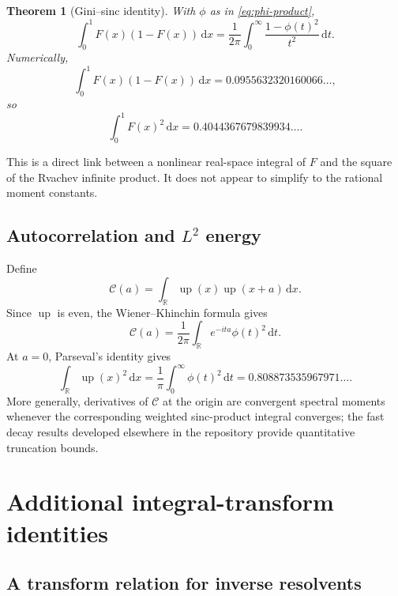 \documentclass[11pt,oneside]{article}
\newtheorem{theorem}{Theorem}[section]
\theoremstyle{definition}
\newcommand{\F}{F}
\newcommand{\upf}{\operatorname{up}}
\newcommand{\R}{\mathbb R}
\newcommand{\dd}{\,\mathrm d}
\begin{document}
\begin{theorem}[Gini--sinc identity]\label{thm:gini-sinc}
With \(\phi\) as in \cref{eq:phi-product},
\begin{equation}\label{eq:Gini-sinc}
 \boxed{\displaystyle
 \int_0^1\F(x)(1-\F(x))\dd x
 =\frac1{2\pi}\int_0^\infty
 \frac{1-\phi(t)^2}{t^2}\dd t.}
\end{equation}
Numerically,
\begin{equation}\label{eq:Gini-numeric}
 \int_0^1\F(x)(1-\F(x))\dd x
 =0.0955632320160066\ldots,
\end{equation}
so
\begin{equation}\label{eq:F2-numeric}
 \int_0^1\F(x)^2\dd x
 =0.4044367679839934\ldots.
\end{equation}
\end{theorem}

This is a direct link between a nonlinear real-space integral of \(\F\) and the square
of the Rvachev infinite product.  It does not appear to simplify to the rational moment
constants.

\subsection{Autocorrelation and \(L^2\) energy}

Define
\begin{equation}\label{eq:Cautocorr}
 \mathcal C(a)=\int_\R\upf(x)\upf(x+a)\dd x.
\end{equation}
Since \(\upf\) is even, the Wiener--Khinchin formula gives
\begin{equation}\label{eq:autocorr-Fourier}
 \mathcal C(a)=\frac1{2\pi}
 \int_\R e^{-ita}\phi(t)^2\dd t.
\end{equation}
At \(a=0\), Parseval's identity gives
\begin{equation}\label{eq:up-L2}
 \int_\R\upf(x)^2\dd x
 =\frac1\pi\int_0^\infty\phi(t)^2\dd t
 =0.808873535967971\ldots.
\end{equation}
More generally, derivatives of \(\mathcal C\) at the origin are convergent spectral
moments whenever the corresponding weighted sinc-product integral converges; the fast
decay results developed elsewhere in the repository provide quantitative truncation
bounds.

\section{Additional integral-transform identities}

\subsection{A transform relation for inverse resolvents}
\end{document}
